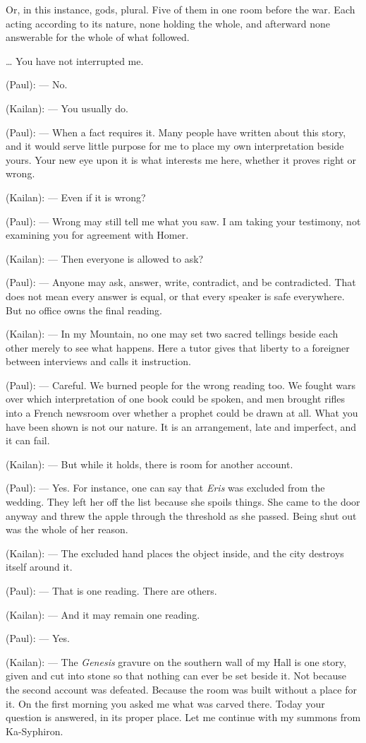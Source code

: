 \begin{room}
Or, in this instance, gods, plural. Five of them in one room before the war. Each acting according to its nature, none holding the whole, and afterward none answerable for the whole of what followed.

\ldots{} You have not interrupted me.

(Paul): --- No.

(Kailan): --- You usually do.

(Paul): --- When a fact requires it. Many people have written about this story, and it would serve little purpose for me to place my own interpretation beside yours. Your new eye upon it is what interests me here, whether it proves right or wrong.

(Kailan): --- Even if it is wrong?

(Paul): --- Wrong may still tell me what you saw. I am taking your testimony, not examining you for agreement with Homer.

(Kailan): --- Then everyone is allowed to ask?

(Paul): --- Anyone may ask, answer, write, contradict, and be contradicted. That does not mean every answer is equal, or that every speaker is safe everywhere. But no office owns the final reading.

(Kailan): --- In my Mountain, no one may set two sacred tellings beside each other merely to see what happens. Here a tutor gives that liberty to a foreigner between interviews and calls it instruction.

(Paul): --- Careful. We burned people for the wrong reading too. We fought wars over which interpretation of one book could be spoken, and men brought rifles into a French newsroom over whether a prophet could be drawn at all. What you have been shown is not our nature. It is an arrangement, late and imperfect, and it can fail.

(Kailan): --- But while it holds, there is room for another account.

(Paul): --- Yes. For instance, one can say that \textit{Eris} was excluded from the wedding. They left her off the list because she spoils things. She came to the door anyway and threw the apple through the threshold as she passed. Being shut out was the whole of her reason.

(Kailan): --- The excluded hand places the object inside, and the city destroys itself around it.

(Paul): --- That is one reading. There are others.

(Kailan): --- And it may remain one reading.

(Paul): --- Yes.

(Kailan): --- The \textit{Genesis} gravure on the southern wall of my Hall is one story, given and cut into stone so that nothing can ever be set beside it. Not because the second account was defeated. Because the room was built without a place for it. On the first morning you asked me what was carved there. Today your question is answered, in its proper place. Let me continue with my summons from Ka-Syphiron.

\end{room}

